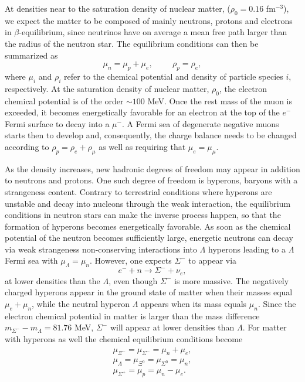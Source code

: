 At densities near to the saturation density of nuclear
matter, ($\rho_0=0.16$ fm$^{-3}$), 
we expect the matter to be composed of mainly neutrons, protons 
and electrons in $\beta$-equilibrium, since neutrinos have on average a
mean free path larger than the radius of the neutron star. The
equilibrium conditions can then be summarized as
\begin{equation}
    \mu_n=\mu_p+\mu_e,  \hspace{1cm} \rho_p = \rho_e,
     \label{eq:npebetaequilibrium}
\end{equation}
where $\mu_i$ and $\rho_i$ refer to the chemical potential and density
of particle species $i$, respectively.
At the saturation density of nuclear matter, $\rho_0$,
the electron chemical potential is
of the order $\sim 100$ MeV.
Once the rest mass of the muon is exceeded, it becomes
energetically favorable for an electron at the top
of the $e^-$ Fermi surface to decay into a
$\mu^-$. A Fermi sea of degenerate negative muons starts then to develop
and, consequently, the charge balance needs to be changed
according to $\rho_p = \rho_e+\rho_{\mu}$
as well as requiring that $\mu_e = \mu_{\mu}$.

As the density increases, new hadronic degrees of freedom may 
appear in addition
to neutrons and protons.
One such degree of freedom is hyperons, baryons with a
strangeness content.
Contrary to terrestrial conditions where hyperons are unstable and decay
into nucleons through the weak interaction, the equilibrium conditions
in neutron stars can make the inverse process happen, so that the
formation of hyperons becomes energetically favorable.     
As soon as the chemical potential
of the neutron becomes sufficiently large, energetic neutrons
can decay via weak strangeness non-conserving interactions
into $\Lambda$ hyperons leading to a $\Lambda$ Fermi sea
with $\mu_{\Lambda}=\mu_n$.
However, one expects $\Sigma^-$ to appear via
\begin{equation}
    e^-+n \rightarrow \Sigma^- +\nu_e,
\end{equation}
at lower densities than the $\Lambda$, even though $\Sigma^-$ is more
massive. The negatively charged hyperons
appear in the ground state of matter when their masses
equal $\mu_e+\mu_n$, while the neutral hyperon $\Lambda$
appears when its mass equals $\mu_n$. Since the
electron chemical potential in matter is larger than
the mass difference $m_{\Sigma^-}-m_{\Lambda}= 81.76$ MeV,
$\Sigma^-$ will appear at lower densities than $\Lambda$.
For matter with hyperons as well
the chemical equilibrium conditions become
\begin{eqnarray}
    \mu_{\Xi^-}=\mu_{\Sigma^-} = \mu_n + \mu_e, \nonumber \\
    \mu_{\Lambda} = \mu_{\Xi^0}=\mu_{\Sigma^0} = \mu_n , \nonumber \\
    \mu_{\Sigma^+} = \mu_p = \mu_n - \mu_e .
    \label{eq:beta_baryonicmatter}
\end{eqnarray}

